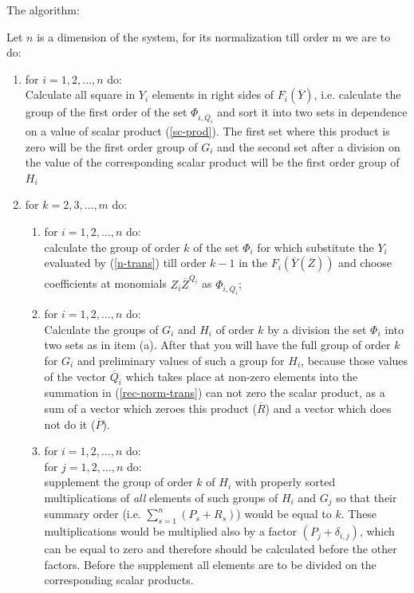 The algorithm:

Let $n$ is a dimension of the system, for its normalization till
order m we are to do:

\begin{enumerate}
\renewcommand{\theenumi}{(\roman{enumi})}

\item
for $i=1,2,\ldots,n$ do:\\
Calculate all square in $Y_i$ elements in right sides of  
$F_i(\overline{Y})$, i.e. calculate the group of the first 
order of the set $\Phi_{i,\overline{Q}_i}$ and sort it into two 
sets in dependence on a value of 
scalar product (\ref{sc-prod}). The first set where this product 
is zero will be the first order group of $G_i$ and the second set
after a division on the value 
of the corresponding scalar product will be the first order group of $H_i$ 

\item
for $k=2,3,\ldots,m$ do:
   \begin{enumerate}

   \item
   for $i=1,2,\ldots,n$ do:\\
   calculate the group of order $k$ of the set
   $\Phi_i$ for which substitute the $Y_i$ evaluated by (\ref{n-trans}) 
   till order $k-1$ in the $F_i(\overline{Y}(\overline{Z}))$
   and choose coefficients at monomials 
   $Z_i \overline{Z}^{\overline{Q}_i}$ as $\Phi_{i,\overline{Q}_i}$;
   
   \item
   for $i=1,2,\ldots,n$ do:\\
   Calculate the groups of $G_i$ and $H_i$ of order $k$  by a division 
   the set $\Phi_i$ into two sets as in item (a). After that you will
   have the full group of order $k$ for $G_i$ and preliminary values
   of such a group for $H_i$, because those values of the vector 
   $\overline{Q}_i$ 
   which takes place at non-zero elements into the summation in
   (\ref{rec-norm-trans}) can not zero the scalar product,
   as a sum of a vector which zeroes this product ($\overline{R}$)
   and a vector which does not do it ($\overline{P}$).

   \item
   for $i=1,2,\ldots,n$ do:\\
   for $j=1,2,\ldots,n$ do:\\
   supplement the group of order $k$ of $H_i$ with properly sorted
   multiplications of {\em all} elements of such groups of $H_i$
   and $G_j$ so that their summary order (i.e. $\sum_{s=1}^n (P_s+R_s)$) 
   would be equal to $k$. These multiplications would be multiplied also 
   by a factor
   $(P_j+\delta_{i,j})$, which can be equal to zero and therefore
   should be calculated before the other factors. Before the supplement
   all elements are to be divided on the corresponding scalar products. 

   \end{enumerate}
\end{enumerate}

